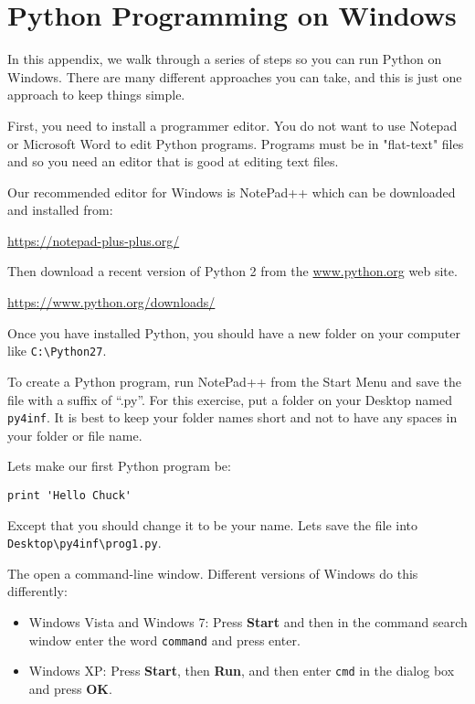 
\chapter{Python Programming on Windows}

In this appendix, we walk through a series of steps
so you can run Python on Windows.  There are many different 
approaches you can take, and this is just one
approach to keep things simple.

First, you need to install a programmer editor.  You
do not want to use Notepad or Microsoft Word to edit
Python programs.  Programs must be in "flat-text" files
and so you need an editor that is good at
editing text files.

Our recommended editor for Windows is NotePad++ which
can be downloaded and installed from:

\url{https://notepad-plus-plus.org/}

Then download a recent version of Python 2 from the
\url{www.python.org} web site.

\url{https://www.python.org/downloads/}

Once you have installed Python, you should have a new
folder on your computer like {\tt C:{\textbackslash}Python27}.

To create a Python program, run NotePad++ from the Start Menu
and save the file with a suffix of ``.py''.  For this
exercise, put a folder on your Desktop named 
{\tt py4inf}.  It is best to keep your folder names short
and not to have any spaces in your folder or file name.

Lets make our first Python program be:

\beforeverb
\begin{verbatim}
print 'Hello Chuck'
\end{verbatim}
\afterverb
%
Except that you should change it to be your name.  Lets
save the file into {\tt Desktop{\textbackslash}py4inf{\textbackslash}prog1.py}.

The open a command-line window.  Different versions of Windows
do this differently:

\begin{itemize}
\item Windows Vista and Windows 7: Press {\bf Start}
and then in the command search window enter the word
{\tt command} and press enter.

\item Windows XP: Press {\bf Start}, then {\bf Run}, and 
then enter {\tt cmd} in the dialog box and press {\bf OK}.
\end{itemize}

